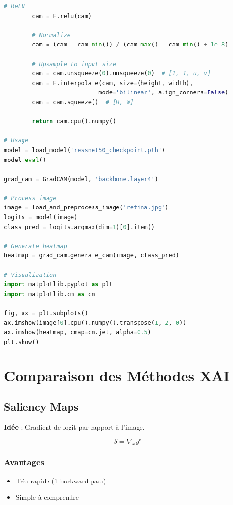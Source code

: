 \documentclass[12pt,a4paper,oneside]{report}
\begin{document}
\begin{lstlisting}[language=Python, caption=Grad-CAM Implementation]
        # ReLU
        cam = F.relu(cam)
        
        # Normalize
        cam = (cam - cam.min()) / (cam.max() - cam.min() + 1e-8)
        
        # Upsample to input size
        cam = cam.unsqueeze(0).unsqueeze(0)  # [1, 1, u, v]
        cam = F.interpolate(cam, size=(height, width), 
                           mode='bilinear', align_corners=False)
        cam = cam.squeeze()  # [H, W]
        
        return cam.cpu().numpy()

# Usage
model = load_model('ressnet50_checkpoint.pth')
model.eval()

grad_cam = GradCAM(model, 'backbone.layer4')

# Process image
image = load_and_preprocess_image('retina.jpg')
logits = model(image)
class_pred = logits.argmax(dim=1)[0].item()

# Generate heatmap
heatmap = grad_cam.generate_cam(image, class_pred)

# Visualization
import matplotlib.pyplot as plt
import matplotlib.cm as cm

fig, ax = plt.subplots()
ax.imshow(image[0].cpu().numpy().transpose(1, 2, 0))
ax.imshow(heatmap, cmap=cm.jet, alpha=0.5)
plt.show()
\end{lstlisting}

\section{Comparaison des Méthodes XAI}

\subsection{Saliency Maps}

\textbf{Idée} : Gradient de logit par rapport à l'image.

\begin{equation}
S = \nabla_x y^c
\end{equation}

\subsubsection{Avantages}

\begin{itemize}
    \item Très rapide (1 backward pass)
    \item Simple à comprendre
\end{itemize}
\end{document}
